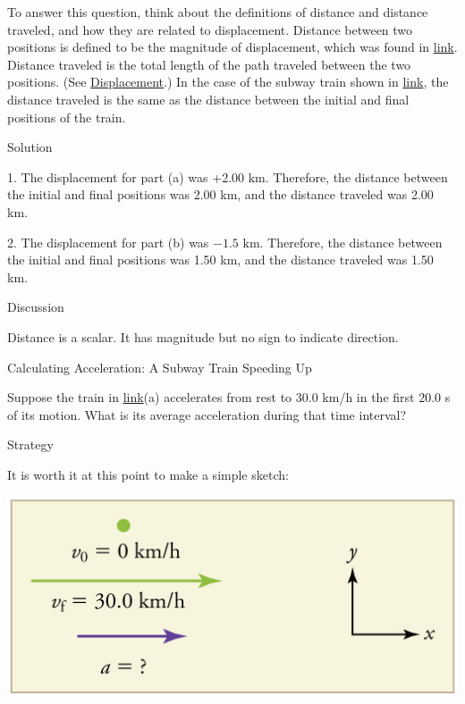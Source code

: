\documentclass[
]{book}
\newenvironment{tinysection}{}{}
\begin{document}
To answer this question, think about the definitions of distance and
distance traveled, and how they are related to displacement. Distance
between two positions is defined to be the magnitude of displacement,
which was found in \protect\hyperlink{fs-id1744930}{link}.
Distance traveled is the total length of the path traveled between the
two positions. (See \href{/m54769}{Displacement}.) In the case of the subway
train shown in \protect\hyperlink{import-auto-id2590556}{link},
the distance traveled is the same as the distance between the initial
and final positions of the train.

\begin{tinysection}

{Solution}

\end{tinysection}

1. The displacement for part (a) was +2.00 km. Therefore, the distance
between the initial and final positions was 2.00 km, and the distance
traveled was 2.00 km.

2. The displacement for part (b) was \(\text{−1.5\ km.}\) Therefore, the
distance between the initial and final positions was 1.50 km, and the
distance traveled was 1.50 km.

\begin{tinysection}

{Discussion}

\end{tinysection}

Distance is a scalar. It has magnitude but no sign to indicate
direction.

\hypertarget{fs-id1372721}{}
Calculating Acceleration: A Subway Train Speeding Up

Suppose the train in
\protect\hyperlink{import-auto-id2590556}{link}(a) accelerates
from rest to 30.0 km/h in the first 20.0 s of its motion. What is its
average acceleration during that time interval?

\begin{tinysection}

{Strategy}

\end{tinysection}

It is worth it at this point to make a simple sketch:

\includegraphics{images/Figure_02_03_03c.jpg}
\end{document}
